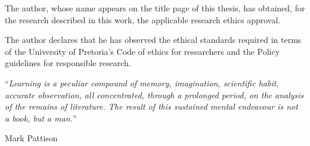 \documentclass[
11pt, %
english, %
singlespacing, %
liststotoc, %
toctotoc, %
headsepline, %
]{MastersDoctoralThesis} %
\begin{document}
\begin{ethicsdeclaration}
\addchaptertocentry{\ethicsname}

The author, whose name appears on the title page of this thesis, has obtained,
for the research described in this work, the applicable research ethics
approval.

The author declares that he has observed the ethical standards required in terms
of the University of Pretoria’s Code of ethics for researchers and the Policy
guidelines for responsible research.

\end{ethicsdeclaration}

\cleardoublepage


\vspace*{0.2\textheight}

\noindent\enquote{\itshape Learning is a peculiar compound of memory, imagination, scientific habit,
accurate observation, all concentrated, through a prolonged period, on the
analysis of the remains of literature. The result of this sustained mental
endeavour is not a book, but a man.}\bigbreak

\hfill Mark Pattison

\end{document}
